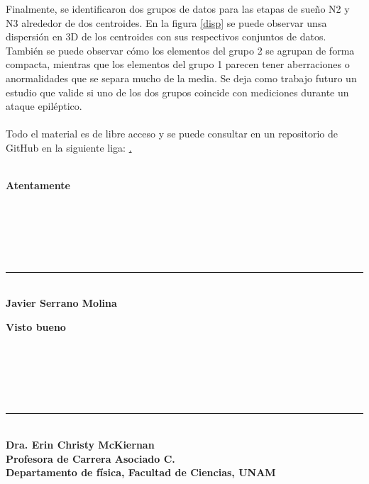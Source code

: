 \documentclass[11pt,letterpaper]{article}
\begin{document}
\begin{flushleft}
Finalmente, se identificaron dos grupos de datos para las etapas de sueño N2 y N3 alrededor de dos centroides. En la figura \ref{disp} se puede observar unsa dispersión en 3D de los centroides con sus respectivos conjuntos de datos. También se puede observar cómo los elementos del grupo 2 se agrupan de forma compacta, mientras que los elementos del grupo 1 parecen tener aberraciones o anormalidades que se separa mucho de la media. Se deja como trabajo futuro un estudio que valide si uno de los dos grupos coincide con mediciones durante un ataque epiléptico.\\
 \hfill \\
Todo el material es de libre acceso y se puede consultar en un repositorio de GitHub en la siguiente liga: \href{https://github.com/Javi-ciencias/Servicio\_social}. \\
\hfill \\
\end{flushleft}
\begin{multicols}{2}
 \begin{center}
\textbf{Atentamente} \\
\hfill \\
\hfill \\
\hfill \\
\hfill \\
\hfill \\
\rule{7cm}{0.4pt}\\
\textbf{Javier Serrano Molina}\\
\end{center}
 \columnbreak
 \begin{center}
\textbf{Visto bueno} \\
\hfill \\
\hfill \\
\hfill \\
\hfill \\
\hfill \\
\rule{7cm}{0.4pt}\\
\textbf{Dra. Erin Christy McKiernan}\\
\textbf{Profesora de Carrera Asociado C.}\\
\textbf{Departamento de física, Facultad de Ciencias, UNAM}
\end{center}
\end{multicols}
\end{document}
